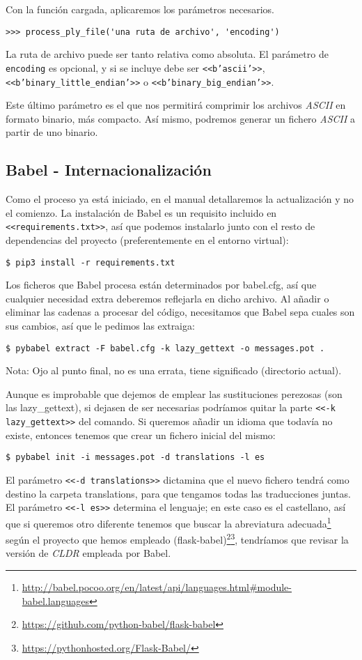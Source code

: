 Con la función cargada, aplicaremos los parámetros necesarios.

\noindent\verb|>>> process_ply_file('una ruta de archivo', 'encoding')|

La ruta de archivo puede ser tanto relativa como absoluta.
El parámetro de \texttt{encoding} es opcional, y si se incluye debe ser \texttt{<<b'ascii'>>}, \texttt{<<b'binary\_little\_endian'>>} o \texttt{<<b{'binary\_big\_endian'}>>}.

Este último parámetro es el que nos permitirá comprimir los archivos \textit{ASCII} en formato binario, más compacto. Así mismo, podremos generar un fichero \textit{ASCII} a partir de uno binario.

\subsection{Babel - Internacionalización}
Como el proceso ya está iniciado, en el manual detallaremos la actualización y no el comienzo.
La instalación de Babel es un requisito incluido en \texttt{<<requirements.txt>>}, así que podemos instalarlo junto con el resto de dependencias del proyecto (preferentemente en el entorno virtual):

\noindent\verb|$ pip3 install -r requirements.txt|

Los ficheros que Babel procesa están determinados por babel.cfg, así que cualquier necesidad extra deberemos reflejarla en dicho archivo.
Al añadir o eliminar las cadenas a procesar del código, necesitamos que Babel sepa cuales son sus cambios, así que le pedimos las extraiga:

\noindent\verb|$ pybabel extract -F babel.cfg -k lazy_gettext -o messages.pot .|

Nota: Ojo al punto final, no es una errata, tiene significado (directorio actual).

Aunque es improbable que dejemos de emplear las sustituciones perezosas (son las lazy\_gettext), si dejasen de ser necesarias podríamos quitar la parte \texttt{<<-k lazy\_gettext>>} del comando.
Si queremos añadir un idioma que todavía no existe, entonces tenemos que crear un fichero inicial del mismo:

\noindent\verb|$ pybabel init -i messages.pot -d translations -l es|

El parámetro \texttt{<<-d translations>>} dictamina que el nuevo fichero tendrá como destino la carpeta translations, para que tengamos todas las traducciones juntas.
El parámetro \texttt{<<-l es>>} determina el lenguaje; en este caso es el castellano, así que si queremos otro diferente tenemos que buscar la abreviatura adecuada\footnote{\url{http://babel.pocoo.org/en/latest/api/languages.html\#module-babel.languages}} según el proyecto que hemos empleado (flask-babel)\footnote{\url{https://github.com/python-babel/flask-babel}}\footnote{\url{https://pythonhosted.org/Flask-Babel/}}, tendríamos que revisar la versión de \textit{CLDR} empleada por Babel.

